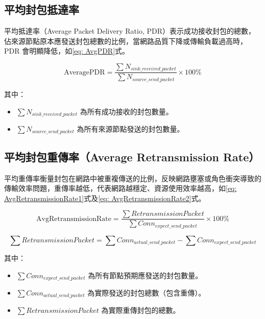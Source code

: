 \begin{ZhChapter}
\subsection{平均封包抵達率}

平均抵達率（Average Packet Delivery Ratio, PDR）表示成功接收封包的總數，佔來源節點原本應發送封包總數的比例，當網路品質下降或傳輸負載過高時，PDR 會明顯降低，如\ref{eq: AvgPDR}式。

\begin{equation}
\label{eq: AvgPDR}
\text{AveragePDR} = \frac{\sum N_{sink\_received\_packet}}{\sum N_{source\_send\_packet}} \times 100\%
\end{equation}

其中：
\begin{itemize}
    \item $\sum N_{sink\_received\_packet}$ 為所有成功接收的封包數量。
    \item $\sum N_{source\_send\_packet}$ 為所有來源節點發送的封包數量。
\end{itemize}

\subsection{平均封包重傳率（Average Retransmission Rate）}

平均重傳率衡量封包在網路中被重複傳送的比例，反映網路壅塞或角色衝突導致的傳輸效率問題，重傳率越低，代表網路越穩定、資源使用效率越高，如\ref{eq: AvgRetransmissionRate1}式及\ref{eq: AvgRetransmissionRate2}式。

\begin{equation}
\label{eq: AvgRetransmissionRate1}
\text{AvgRetransmissionRate} = \frac{\sum RetransmissionPacket}{\sum Conn_{expect\_send\_packet}} \times 100\%
\end{equation}

\begin{equation}
\label{eq: AvgRetransmissionRate2}
\sum RetransmissionPacket = \sum Conn_{actual\_send\_packet} - \sum Conn_{expect\_send\_packet}
\end{equation}

其中：
\begin{itemize}
    \item $\sum Conn_{expect\_send\_packet}$ 為所有節點預期應發送的封包數量。
    \item $\sum Conn_{actual\_send\_packet}$ 為實際發送的封包總數（包含重傳）。
    \item $\sum RetransmissionPacket$ 為實際重傳封包的總數。
\end{itemize}


\end{ZhChapter}
